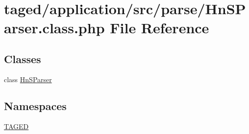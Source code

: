 \hypertarget{_hn_s_parser_8class_8php}{}\section{taged/application/src/parse/\+Hn\+S\+Parser.class.\+php File Reference}
\label{_hn_s_parser_8class_8php}
\subsection*{Classes}
\begin{DoxyCompactItemize}
\item 
class \hyperlink{class_hn_s_parser}{Hn\+S\+Parser}
\end{DoxyCompactItemize}
\subsection*{Namespaces}
\begin{DoxyCompactItemize}
\item 
 \hyperlink{namespace_t_a_g_e_d}{T\+A\+G\+ED}
\end{DoxyCompactItemize}
